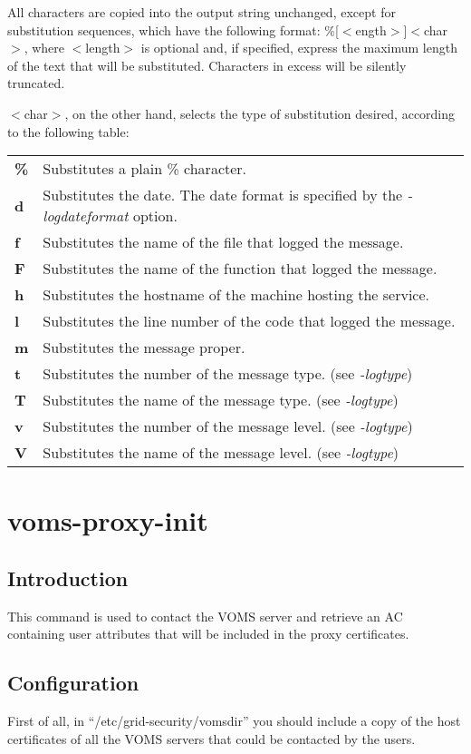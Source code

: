 \documentclass[a4paper]{book}
\begin{document}
All characters are copied into the output string unchanged, except for
substitution sequences, which have the following format:
\%[$<$ength$>$]$<$char$>$, where $<$length$>$ is optional and, if
specified, express the maximum length of the text that will be
substituted. Characters in excess will be silently truncated.

$<$char$>$, on the other hand, selects the type of substitution desired,
according to the following table:

\begin{longtable}{lp{4in}}
\textbf{\%} & Substitutes a plain \% character.\\
\textbf{d}  & Substitutes the date. The date format is specified by
              the \emph{-logdateformat} option.\\
\textbf{f}  & Substitutes the name of the file that logged the message.\\
\textbf{F}  & Substitutes the name of the function that logged the message.\\
\textbf{h}  & Substitutes the hostname of the machine hosting the service.\\
\textbf{l}  & Substitutes the line number of the code that logged the message.\\
\textbf{m}  & Substitutes the message proper.\\
\textbf{t}  & Substitutes the number of the message type. (see \emph{-logtype})\\
\textbf{T}  & Substitutes the name of the message type. (see \emph{-logtype})\\
\textbf{v}  & Substitutes the number of the message level. (see \emph{-logtype})\\
\textbf{V}  & Substitutes the name of the message level. (see \emph{-logtype})\\
\end{longtable}

\chapter{voms-proxy-init}
\section{Introduction}
This command is used to contact the VOMS server and retrieve an AC
containing user attributes that will be included in the proxy
certificates.


\section{Configuration}
First of all, in ``/etc/grid-security/vomsdir'' you should include a
copy of the host certificates of all the VOMS servers that could be
contacted by the users.
\end{document}
